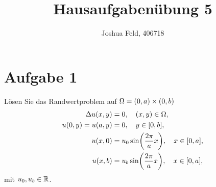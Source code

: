 \documentclass{exercise}
\institute{Applied and Computational Mathematics}
\title{Hausaufgabenübung 5}
\author{Joshua Feld, 406718}
\begin{document}
    \maketitle


    \section*{Aufgabe 1}

    \begin{problem}
        Lösen Sie das Randwertproblem auf \(\Omega = \parentheses*{0, a} \times \parentheses*{0, b}\)
        \begin{align*}
            \Delta u\parentheses*{x, y} &= 0, \quad \parentheses*{x, y} \in \Omega,\\
            u\parentheses*{0, y} = u\parentheses*{a, y} &= 0, \quad y \in \brackets*{0, b},\\
            u\parentheses*{x, 0} &= u_0\sin\parentheses*{\frac{2\pi}{a}x}, \quad x \in \brackets*{0, a},\\
            u\parentheses*{x, b} &= u_b\sin\parentheses*{\frac{2\pi}{a}x}, \quad x \in \brackets*{0, a},
        \end{align*}
        mit \(u_0, u_b \in \R\).
    \end{problem}
\end{document}
